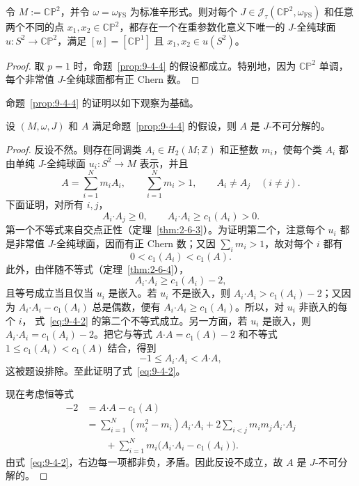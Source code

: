 \begin{corollary}[格罗莫夫]\label{cor:9-4-5}
令 $M:=\mathbb{CP}^2$，并令 $\omega=\omega_{\mathrm{FS}}$ 为标准辛形式。则对每个
$J\in\mathcal J_\tau(\mathbb{CP}^2,\omega_{\mathrm{FS}})$ 和任意两个不同的点
$x_1,x_2\in\mathbb{CP}^2$，都存在一个在重参数化意义下唯一的 $J$-全纯球面
$u:S^2\to\mathbb{CP}^2$，满足
$[u]=[\mathbb{CP}^1]$ 且 $x_1,x_2\in u(S^2)$。
\end{corollary}

\begin{proof}
取 $p=1$ 时，命题~\ref{prop:9-4-4} 的假设都成立。特别地，因为
$\mathbb{CP}^2$ 单调，每个非常值 $J$-全纯球面都有正 Chern 数。
\end{proof}

命题~\ref{prop:9-4-4} 的证明以如下观察为基础。

\begin{lemma}\label{lem:9-4-6}
设 $(M,\omega,J)$ 和 $A$ 满足命题~\ref{prop:9-4-4} 的假设，则 $A$ 是
$J$-不可分解的。
\end{lemma}

\begin{proof}
反设不然。则存在同调类 $A_i\in H_2(M;\mathbb Z)$ 和正整数 $m_i$，使每个类 $A_i$
都由单纯 $J$-全纯球面 $u_i:S^2\to M$ 表示，并且
\[
  A=\sum_{i=1}^Nm_iA_i,
  \qquad
  \sum_{i=1}^Nm_i>1,
  \qquad
  A_i\ne A_j\quad(i\ne j).
\]
下面证明，对所有 $i,j$，
\begin{equation}\label{eq:9-4-2}
  A_i\mathbin{\boldsymbol\cdot}A_j\ge0,
  \qquad
  A_i\mathbin{\boldsymbol\cdot}A_i\ge c_1(A_i)>0.
\end{equation}
第一个不等式来自交点正性（定理~\ref{thm:2-6-3}）。为证明第二个，注意每个 $u_i$
都是非常值 $J$-全纯球面，因而有正 Chern 数；又因 $\sum_i m_i>1$，故对每个 $i$ 都有
\[
  0<c_1(A_i)<c_1(A).
\]
此外，由伴随不等式（定理~\ref{thm:2-6-4}），
\[
  A_i\mathbin{\boldsymbol\cdot}A_i\ge c_1(A_i)-2,
\]
且等号成立当且仅当 $u_i$ 是嵌入。若 $u_i$ 不是嵌入，则
$A_i\mathbin{\boldsymbol\cdot}A_i>c_1(A_i)-2$；又因为
$A_i\mathbin{\boldsymbol\cdot}A_i-c_1(A_i)$ 总是偶数，便有
$A_i\mathbin{\boldsymbol\cdot}A_i\ge c_1(A_i)$。所以，对 $u_i$ 非嵌入的每个 $i$，
式~\eqref{eq:9-4-2} 的第二个不等式成立。另一方面，若 $u_i$ 是嵌入，则
$A_i\mathbin{\boldsymbol\cdot}A_i=c_1(A_i)-2$。把它与等式
$A\mathbin{\boldsymbol\cdot}A=c_1(A)-2$ 和不等式
$1\le c_1(A_i)<c_1(A)$ 结合，得到
\[
  -1\le A_i\mathbin{\boldsymbol\cdot}A_i
  <A\mathbin{\boldsymbol\cdot}A,
\]
这被题设排除。至此证明了式~\eqref{eq:9-4-2}。

现在考虑恒等式
\[
\begin{split}
  -2
  &=A\mathbin{\boldsymbol\cdot}A-c_1(A)\\
  &=\sum_{i=1}^N(m_i^2-m_i)
       A_i\mathbin{\boldsymbol\cdot}A_i
    +2\sum_{i<j}m_im_jA_i\mathbin{\boldsymbol\cdot}A_j\\
  &\qquad
    +\sum_{i=1}^Nm_i
       \bigl(A_i\mathbin{\boldsymbol\cdot}A_i-c_1(A_i)\bigr).
\end{split}
\]
由式~\eqref{eq:9-4-2}，右边每一项都非负，矛盾。因此反设不成立，故 $A$ 是
$J$-不可分解的。
\end{proof}

